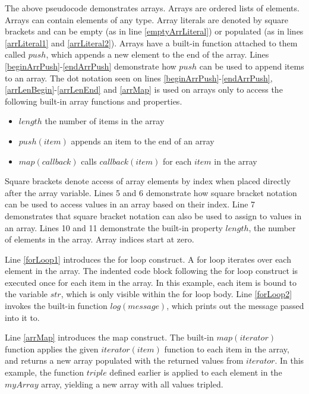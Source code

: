 The above pseudocode demonstrates arrays. Arrays are ordered lists of elements. Arrays can contain elements of any type. Array literals are denoted by square brackets and can be empty (as in line \ref{emptyArrLiteral}) or populated (as in lines \ref{arrLiteral1} and \ref{arrLiteral2}). Arrays have a built-in function attached to them called $push$, which appends a new element to the end of the array. Lines \ref{beginArrPush}-\ref{endArrPush} demonstrate how $push$ can be used to append items to an array. The dot notation seen on lines \ref{beginArrPush}-\ref{endArrPush}, \ref{arrLenBegin}-\ref{arrLenEnd} and \ref{arrMap} is used on arrays only to access the following built-in array functions and properties.

\begin{itemize}
\item $length$ the number of items in the array
\item $push(item)$ appends an item to the end of an array
\item $map(callback)$ calls $callback(item)$ for each $item$ in the array
\end{itemize}

Square brackets denote access of array elements by index when placed directly after the array variable. Lines 5 and 6 demonstrate how square bracket notation can be used to access values in an array based on their index. Line 7 demonstrates that square bracket notation can also be used to assign to values in an array. Lines 10 and 11 demonstrate the built-in property $length$, the number of elements in the array. Array indices start at zero. 

Line \ref{forLoop1} introduces the for loop construct. A for loop iterates over each element in the array. The indented code block following the for loop construct is executed once for each item in the array. In this example, each item is bound to the variable $str$, which is only visible within the for loop body. Line \ref{forLoop2} invokes the built-in function $log(message)$, which prints out the message passed into it to.

Line \ref{arrMap} introduces the map construct. The built-in $map(iterator)$ function applies the given $iterator(item)$ function to each item in the array, and returns a new array populated with the returned values from $iterator$. In this example, the function $triple$ defined earlier is applied to each element in the $myArray$ array, yielding a new array with all values tripled.

